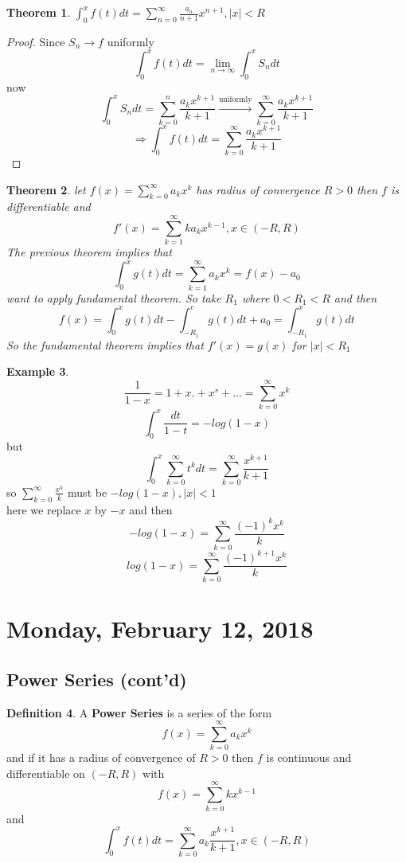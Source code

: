 \documentclass[12pt]{article}
\theoremstyle{plain}
\newtheorem{theorem}{Theorem}[section]
\theoremstyle{definition}
\newtheorem{definition}[theorem]{Definition}
\newtheorem{example}[theorem]{Example}
\begin{document}
\begin{theorem}
	$\int^x_0 f(t) dt = \sum^\infty_{n=0} \frac{a_n}{n+1} x^{n+1}, |x| < R$
\end{theorem}

\begin{proof}
	Since $S_n \to f$ uniformly
	$$\int^x_0 f(t) dt = \lim_{n\to\infty} \int^x_0 S_n dt$$
	now
	$$\int^x_0 S_n dt = \sum^n_{k=0} \frac{a_k x^{k+1}}{k+1} \overset{\text{uniformly}}{\to} \sum^\infty_{k=0} \frac{a_k x^{k+1}}{k+1}$$
	$$\Longrightarrow \int^x_0 f(t) dt = \sum^\infty_{k=0} \frac{a_k x^{k+1}}{k+1}$$
\end{proof}

\begin{theorem}
	let $f(x)=\sum^\infty_{k=0} a_k x^k$ has radius of convergence $R>0$ then $f$ is differentiable and $$f'(x) = \sum^\infty_{k=1} k a_k x^{k-1}, x\in (-R,R)$$
	The previous theorem implies that
	$$\int^x_0 g(t)dt = \sum^\infty_{k=1} a_k x^k = f(x) - a_0 $$
	want to apply fundamental theorem.
	So take $R_1$ where $0 < R_1 < R$ and then
	$$f(x) = \int^x_0 g(t)dt - \int^c_{-R_1} g(t) dt + a_0 = \int^x_{-R_1} g(t) dt$$
	So the fundamental theorem implies that
	$f'(x) = g(x)$ for $|x| < R_1$
\end{theorem}

\begin{example}
	$$\frac{1}{1-x} = 1 + x. + x^s + ... = \sum^\infty_{k=0} x^k$$
	$$\int^x_0 \frac{dt}{1-t} = -log(1-x)$$
	but
	$$\int^x_0 \sum^\infty_{k=0} t^k dt = \sum^\infty_{k=0} \frac{x^{k+1}}{k+1}$$
	so $\sum^\infty_{k=0} \frac{x^k}{k}$ must be $-log(1-x), |x|<1$\\
	here we replace $x$ by $-x$ and then
	$$-log(1-x) = \sum^\infty_{k=0} \frac{(-1)^k x^k}{k}$$
	$$log(1-x) = \sum^\infty_{k=0} \frac{(-1)^{k+1} x^k}{k}$$
\end{example}





\newpage

\section{Monday, February 12, 2018}

\subsection{Power Series (cont'd)}

\begin{definition}
	A \textbf{Power Series} is a series of the form $$f(x) = \sum^\infty_{k=0} a_k x^k$$ and if it has a radius of convergence of $R > 0$ then $f$ is continuous and differentiable on $(-R, R)$  with $$f(x) = \sum^\infty_{k=0} kx^{k-1}$$ and $$\int^x_0 f(t) dt = \sum^\infty_{k=0} a_k \frac{x^{k+1}}{k+1}, x \in (-R, R)$$
\end{definition}
\end{document}
